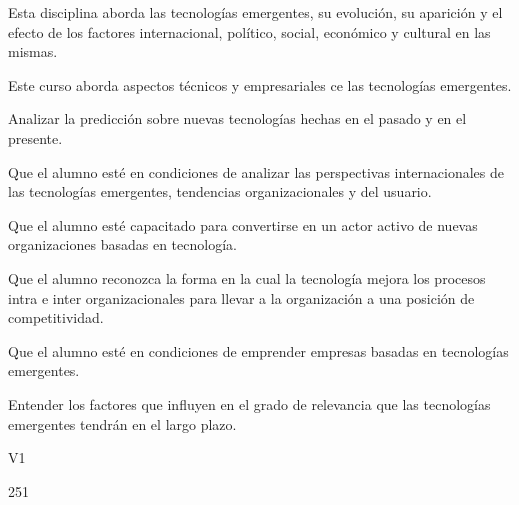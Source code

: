 \begin{syllabus}


\begin{justification}
Esta disciplina aborda las tecnologías emergentes, su evolución, su aparición y el efecto de los factores internacional, político, social, económico y cultural en las mismas.

Este curso aborda aspectos técnicos y empresariales ce las tecnologías emergentes.
\end{justification}

\begin{goals}
\item Analizar la predicción sobre nuevas tecnologías hechas en el pasado y en el presente.
\item Que el alumno esté en condiciones de analizar las perspectivas internacionales de las tecnologías emergentes, tendencias organizacionales y del usuario.
\item Que el alumno esté capacitado para convertirse en un actor activo de nuevas organizaciones basadas en tecnología.
\item Que el alumno reconozca la forma en la cual la tecnología mejora los procesos intra e inter organizacionales para llevar a la organización a una posición de competitividad.
\item Que el alumno esté en condiciones de emprender empresas basadas en tecnologías emergentes.
\item Entender los factores que influyen en el grado de relevancia que las tecnologías emergentes tendrán en el largo plazo.
\end{goals}

\begin{outcomes}{V1}
\end{outcomes}

\begin{unit}{\LUTWOOHFIVEDef}{}{\LUTWOOHFIVEBib}{25}{1}
   \begin{topics}
	\item \TDSONETHREETopicTHREExONETHREExONE
	\begin{subtopics}
		\item \TDSONETHREETopicTHREExONETHREExONExONE
		\item \TDSONETHREETopicTHREExONETHREExONExTWO
		\item \TDSONETHREETopicTHREExONETHREExONExTHREE
		\item \TDSONETHREETopicTHREExONETHREExONExFOUR
		\item \TDSONETHREETopicTHREExONETHREExONExFIVE
	\end{subtopics} 
   \end{topics}
	\LUTWOOHFIVEGoal
\end{unit}


\end{syllabus}
